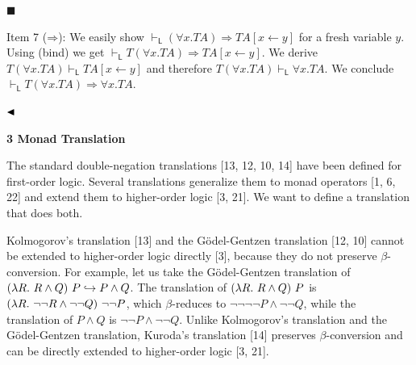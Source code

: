  
 
\par\noindent  $\blacksquare$ 
 
Item 7 ($\mathbin{\Rightarrow}$): We easily show $\vdash_{\mathsf{L}}({\forall}x.TA)\mathbin{\Rightarrow}TA[x\leftarrow y]$ for a fresh variable $y$. Using (bind) we get $\vdash_{\mathsf{L}}T({\forall}x.TA)\mathbin{\Rightarrow}TA[x\leftarrow y]$. We derive $T({\forall}x.TA)\vdash_{\mathsf{L}}TA[x\leftarrow y]$ and therefore $T({\forall}x.TA)\vdash_{\mathsf{L}}{\forall}x.TA$. We conclude $\vdash_{\mathsf{L}}T({\forall}x.TA)\mathbin{\Rightarrow}{\forall}x.TA$.\par
 
 
  
$\hfill\blacktriangleleft$\par
 
 
 
 


 
\par\medskip\noindent\textbf{3 Monad Translation}\par
 
 
The standard double-negation translations [13, 12, 10, 14] have been defined for first-order logic. Several translations generalize them to monad operators [1, 6, 22] and extend them to higher-order logic [3, 21]. We want to define a translation that does both.\par
 
 
 
Kolmogorov’s translation [13] and the Gödel-Gentzen translation [12, 10] cannot be extended to higher-order logic directly [3], because they do not preserve $\beta$-conversion. For example, let us take the Gödel-Gentzen translation of $(\lambda R.\leavevmode\nobreak\ R\mathbin{\wedge}Q)\leavevmode\nobreak\ P\hookrightarrow P\mathbin{\wedge}Q$. The translation of $(\lambda R.\leavevmode\nobreak\ R\mathbin{\wedge}Q)\leavevmode\nobreak\ P$ is $(\lambda R.\leavevmode\nobreak\ \neg\neg R\mathbin{\wedge}\neg\neg Q)\leavevmode\nobreak\ \neg\neg P$, which $\beta$-reduces to $\neg\neg\neg\neg P\mathbin{\wedge}\neg\neg Q$, while the translation of $P\mathbin{\wedge}Q$ is $\neg\neg P\mathbin{\wedge}\neg\neg Q$. Unlike Kolmogorov’s translation and the Gödel-Gentzen translation, Kuroda’s translation [14] preserves $\beta$-conversion and can be directly extended to higher-order logic [3, 21].\par
 

